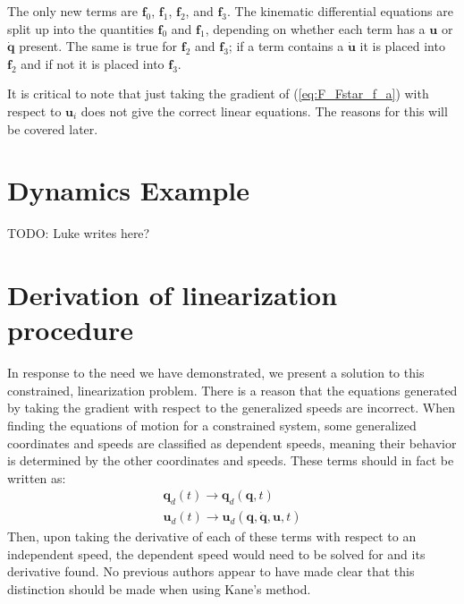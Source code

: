 \documentclass[smallcondensed,final]{svjour3}                     %
\begin{document}
The only new terms are $\mathbf{f}_0$, $\mathbf{f}_1$, $\mathbf{f}_2$, and
$\mathbf{f}_3$.
The kinematic differential equations are split up into the quantities
$\mathbf{f}_0$ and $\mathbf{f}_1$, depending on whether each term has a
$\mathbf{u}$ or $\dot{\mathbf{q}}$ present.
The same is true for $\mathbf{f}_2$ and $\mathbf{f}_3$; if a term contains a
$\dot{\mathbf{u}}$ it is placed into $\mathbf{f}_2$ and if not it is placed
into $\mathbf{f}_3$.

It is critical to note that just taking the gradient of (\ref{eq:F_Fstar_f_a})
with respect to $\mathbf{u}_i$ does not give the correct linear equations. The
reasons for this will be covered later.









\section{Dynamics Example}
TODO: Luke writes here?









\section{Derivation of linearization procedure}
\label{sec:derivations}

In response to the need we have demonstrated, we present a solution to this
constrained, linearization problem.
There is a reason that the equations generated by taking the gradient with
respect to the generalized speeds are incorrect.
When finding the equations of motion for a constrained system, some generalized
coordinates and speeds are classified as dependent speeds, meaning their
behavior is determined by the other coordinates and speeds.
These terms should in fact be written as:
\begin{align}
\label{eq:q_d_redefined}
\mathbf{q}_d (t) \to \mathbf{q}_d (\mathbf{q}, t) \\
\label{eq:u_d_redefined}
\mathbf{u}_d (t) \to \mathbf{u}_d (\mathbf{q}, \dot{\mathbf{q}}, \mathbf{u}, t)
\end{align}
Then, upon taking the derivative of each of these terms with respect to an
independent speed, the dependent speed would need to be solved for and its
derivative found.
No previous authors appear to have made clear that this distinction should be
made when using Kane's method.
\end{document}
